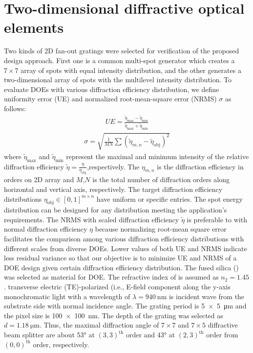 \section{Two-dimensional diffractive optical elements}
Two kinds of 2D fan-out gratings were selected for verification of the proposed design approach.
First one is a common multi-spot generator which creates a $7\times7$ array of spots with equal intensity distribution, and the other generates a two-dimensional array of spots with the multilevel intensity distribution.
To evaluate DOEs with various diffraction efficiency distribution, we define uniformity error (UE) and normalized root-mean-square error (NRMS) $\sigma$ as follows:
\begin{align}\label{eq:ue}
UE = \frac{\tilde{\eta}_{\mathrm{max}}-\tilde{\eta}_{\mathrm{min}}}{\tilde{\eta}_{\mathrm{max}}+\tilde{\eta}_{\mathrm{min}}}
\end{align}
\begin{align}\label{eq:rmse}
\sigma=\sqrt{\frac{1}{MN}\sum(\tilde{\eta}_{m,n}-\tilde{\eta}_{\mathrm{obj}})^2}
\end{align}
where $\tilde{\eta}_{\mathrm{max}}$ and $\tilde{\eta}_{\mathrm{min}}$ represent the maximal and minimum intensity of the relative diffraction efficiency $\tilde{\eta}=\frac{\eta}{\eta_{\mathrm{obj}}}$,respectively.
The $\eta_{m,n}$ is the diffraction efficiency in orders on 2D array and $M$,$N$ is the total number of diffraction orders along horizontal and vertical axis, respectively.
The target diffraction efficiency distributions $\eta_{\mathrm{obj}} \in [0,1]^{m \times n}$ have uniform or specific entries.
The spot energy distribution can be designed for any distribution meeting the application's requirements.
The NRMS with scaled diffraction efficiency $\tilde{\eta}$ is preferable to with normal diffraction efficiency ${\eta}$ because normalizing root-mean square error facilitates the comparison among various diffraction efficiency distributions with different scales from diverse DOEs.
Lower values of both UE and NRMS indicate less residual variance so that our objective is to minimize UE and NRMS of a DOE design given certain diffraction efficiency distribution.
The fused silica () was selected as material for DOE.
The refractive index of  is assumed as $n_{2}=1.45$.
transverse electric (TE)-polarized (i.e., E-field component along the y-axis monochromatic light with a wavelength of $\lambda= \SI{940}{\nano \metre}$ is incident wave from the substrate side with normal incidence angle.
The grating period is \SI{5x5}{\micro \metre} and the pixel size is \SI{100x100}{\nano \metre}.
The depth of the grating was selected as $d= \SI{1.18}{\micro \metre}$.
Thus, the maximal diffraction angle of $7\times7$ and $7\times5$ diffractive beam splitter are about \ang{53} at $(3,3)^\mathrm{th}$ order and \ang{43} at $(2,3)^\mathrm{th}$ order from $(0,0)^\mathrm{th}$ order, respectively. 
